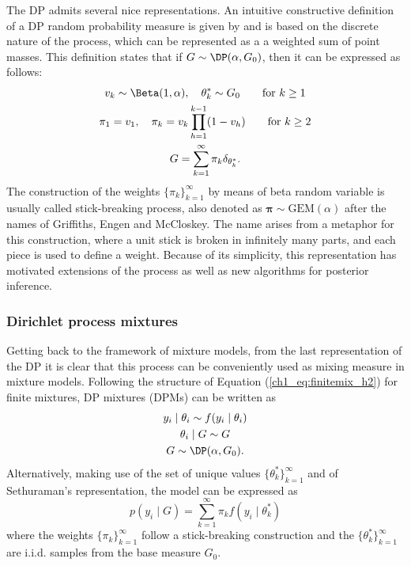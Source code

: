 The DP admits several nice representations. An intuitive constructive definition of a DP random probability measure is given by \textcite{sethuraman1994} and is based on the discrete nature of the process, which can be represented as a a weighted sum of point masses. This definition states that if  $G\sim \DP(\alpha, G_0)$, then it can be expressed as follows:
\begin{gather} 
v_k \sim \Beta(1,\alpha), \quad \theta^*_k \sim G_0 \qquad \text{for } k\geq 1  \nonumber\\
\pi_1 = v_1, \quad \pi_k = v_k \prod_{h = 1}^{k-1} (1-v_h) \qquad \text{for } k\geq 2 \label{ch1_eq:stickbreaking}\\
G = \sum_{k=1}^{\infty} \pi_k \delta_{\theta^*_k}. \nonumber
\end{gather}
The construction of the weights $\{\pi_k\}_{k=1}^{\infty}$ by means of beta random variable is usually called stick-breaking process, also denoted as $\bm{\pi}\sim \mathrm{GEM}(\alpha)$ after the names of Griffiths, Engen and McCloskey. The name arises from a metaphor for this construction, where a unit stick is broken in infinitely many parts, and each piece is used to define a weight.
Because of its simplicity, this representation has motivated extensions of the process as well as new algorithms for posterior inference.


\subsubsection*{Dirichlet process mixtures}
Getting back to the framework of mixture models, from the last representation of the DP it is clear that this process can be conveniently used as mixing measure in mixture models. Following the structure of Equation (\ref{ch1_eq:finitemix_h2}) for finite mixtures, DP mixtures (DPMs) can be written as
\begin{equation*}
\begin{gathered}
y_i \mid \theta_i \sim f(y_i\mid\theta_i)\\
\theta_i \mid G \sim G \\
G \sim \DP(\alpha,G_0).
\end{gathered}
\end{equation*}
Alternatively, making use of the set of unique values $\{\theta^*_k\}_{k=1}^{\infty}$ and of Sethuraman's representation, the model can be expressed as
\begin{equation}
p(y_i\mid G) = \sum_{k=1}^{\infty} \pi_k f(y_i\mid\theta^*_k)
\label{ch1_eq:DPM}
\end{equation}
where the weights $\{\pi_k\}_{k=1}^{\infty}$ follow a stick-breaking construction and the $\{\theta^*_k\}_{k=1}^{\infty}$ are i.i.d. samples from the base measure $G_0$.

